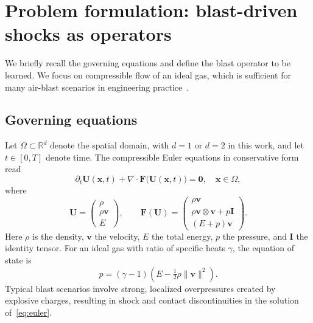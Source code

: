 \documentclass[a4paper,fleqn]{cas-dc}
\begin{document}
\section{Problem formulation: blast-driven shocks as operators}
\label{sec:problem}

We briefly recall the governing equations and define the blast operator to be learned.
We focus on compressible flow of an ideal gas, which is sufficient for many air-blast scenarios in engineering practice~\citep{Toro1999Riemann}.

\subsection{Governing equations}

Let $\Omega \subset \mathbb{R}^d$ denote the spatial domain, with $d=1$ or $d=2$ in this work, and let $t \in [0,T]$ denote time.
The compressible Euler equations in conservative form read
\begin{equation}
  \partial_t \mathbf{U}(\mathbf{x},t)
  + \nabla \cdot \mathbf{F}\big(\mathbf{U}(\mathbf{x},t)\big) = \mathbf{0},
  \quad \mathbf{x}\in\Omega,
  \label{eq:euler}
\end{equation}
where
\begin{equation}
  \mathbf{U} = 
    \begin{pmatrix}
      \rho \\
      \rho \mathbf{v} \\
      E
    \end{pmatrix},
  \qquad
  \mathbf{F}(\mathbf{U}) =
    \begin{pmatrix}
      \rho \mathbf{v} \\
      \rho \mathbf{v} \otimes \mathbf{v} + p \mathbf{I} \\
      (E + p)\mathbf{v}
    \end{pmatrix}.
\end{equation}
Here $\rho$ is the density, $\mathbf{v}$ the velocity, $E$ the total energy, $p$ the pressure, and $\mathbf{I}$ the identity tensor.
For an ideal gas with ratio of specific heats $\gamma$, the equation of state is
\begin{equation}
  p = (\gamma - 1)\left(E - \tfrac{1}{2}\rho \|\mathbf{v}\|^2\right).
\end{equation}
Typical blast scenarios involve strong, localized overpressures created by explosive charges, resulting in shock and contact discontinuities in the solution of~\eqref{eq:euler}.
\end{document}
